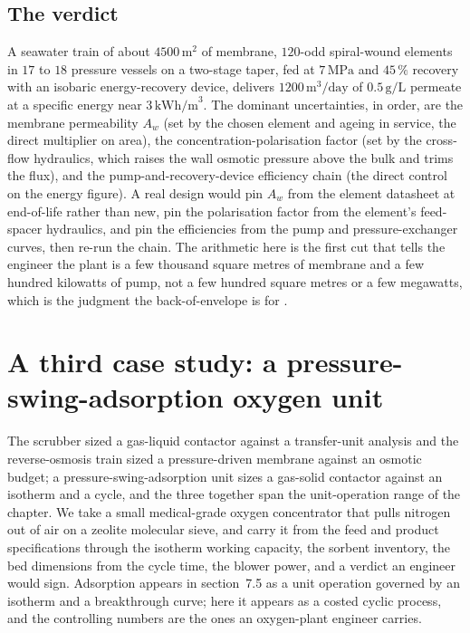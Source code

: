 \subsection{The verdict}

A seawater train of about $4500\,\text{m}^2$ of membrane, $120$-odd
spiral-wound elements in $17$ to $18$ pressure vessels on a two-stage
taper, fed at $7\,\text{MPa}$ and $45\,\%$ recovery with an isobaric
energy-recovery device, delivers $1200\,\text{m}^3/\text{day}$ of
$0.5\,\text{g/L}$ permeate at a specific energy near $3\,\text{kWh/m}^3$.
The dominant uncertainties, in order, are the membrane permeability
$A_w$ (set by the chosen element and ageing in service, the direct
multiplier on area), the concentration-polarisation factor (set by the
cross-flow hydraulics, which raises the wall osmotic pressure above the
bulk and trims the flux), and the pump-and-recovery-device efficiency
chain (the direct control on the energy figure). A real design would pin
$A_w$ from the element datasheet at end-of-life rather than new, pin the
polarisation factor from the element's feed-spacer hydraulics, and pin the
efficiencies from the pump and pressure-exchanger curves, then re-run the
chain. The arithmetic here is the first cut that tells the engineer the
plant is a few thousand square metres of membrane and a few hundred
kilowatts of pump, not a few hundred square metres or a few megawatts,
which is the judgment the back-of-envelope is for
\cite{gen:mackay2009,text:perry-chemical-engineers}.

\section{A third case study: a pressure-swing-adsorption oxygen unit}

The scrubber sized a gas-liquid contactor against a transfer-unit
analysis and the reverse-osmosis train sized a pressure-driven membrane
against an osmotic budget; a pressure-swing-adsorption unit sizes a
gas-solid contactor against an isotherm and a cycle, and the three together
span the unit-operation range of the chapter. We take a small medical-grade
oxygen concentrator that pulls nitrogen out of air on a zeolite molecular
sieve, and carry it from the feed and product specifications through the
isotherm working capacity, the sorbent inventory, the bed dimensions from
the cycle time, the blower power, and a verdict an engineer would sign.
Adsorption appears in section~7.5 as a unit operation governed by an
isotherm and a breakthrough curve; here it appears as a costed cyclic
process, and the controlling numbers are the ones an oxygen-plant engineer
carries.

